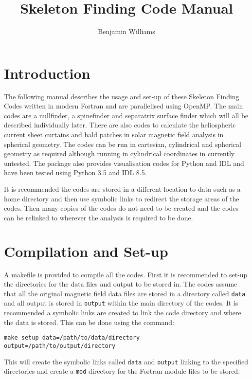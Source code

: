 \documentclass[12pt]{article}
\author{Benjamin Williams}
\title{Skeleton Finding Code Manual}
\begin{document}
  \maketitle

  \section{Introduction}

    The following manual describes the usage and set-up of these Skeleton Finding Codes written in modern Fortran and are parallelised using OpenMP. The main codes are a nullfinder, a spinefinder and separatrix surface finder which will all be described individually later. There are also codes to calculate the heliospheric current sheet curtains and bald patches in solar magnetic field analysis in spherical geometry. The codes can be run in cartesian, cylindrical and spherical geometry as required although running in cylindrical coordinates in currently untested. The package also provides visualisation codes for Python and IDL and have been tested using Python 3.5 and IDL 8.5.
    
    It is recommended the codes are stored in a different location to data such as a home directory and then use symbolic links to redirect the storage areas of the codes. Then many copies of the codes do not need to be created and the codes can be relinked to wherever the analysis is required to be done. 

    \section{Compilation and Set-up}

    A makefile is provided to compile all the codes. First it is recommended to set-up the directories for the data files and output to be stored in. The codes assume that all the original magnetic field data files are stored in a directory called \texttt{data} and all output is stored in \texttt{output} within the main directory of the codes. It is recommended a symbolic links are created to link the code directory and where the data is stored. This can be done using the command:

    \texttt{make setup data=/path/to/data/directory output=/path/to/output/directory}

    This will create the symbolic links called \texttt{data} and \texttt{output} linking to the specified directories and create a \texttt{mod} directory for the Fortran module files to be stored.
\end{document}
